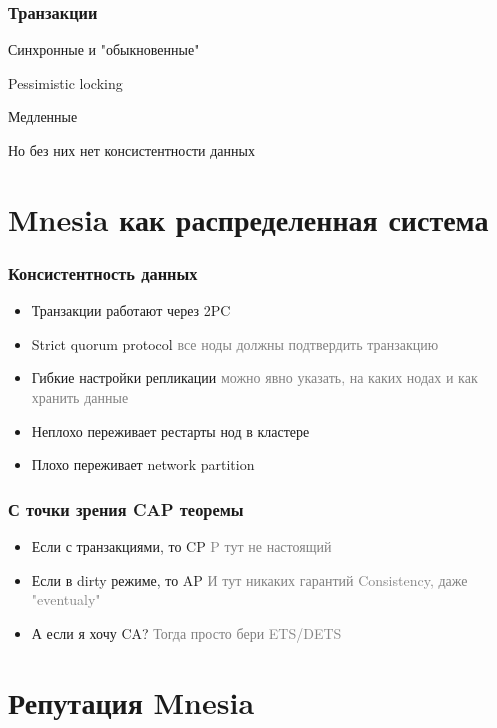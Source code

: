 \documentclass[10pt]{beamer}
\begin{document}
\begin{frame}
\frametitle{Транзакции}
\centering
Синхронные и "обыкновенные"
\par \bigskip
Pessimistic locking
\par \bigskip
Медленные
\par \bigskip
Но без них нет консистентности данных
\end{frame}

\section{Mnesia как распределенная система}

\begin{frame}
\frametitle{Консистентность данных}
\begin{itemize}[<+->]
\item Транзакции работают через 2PC
\item Strict quorum protocol\newline
  \textcolor{gray}{все ноды должны подтвердить транзакцию}
\item Гибкие настройки репликации\newline
  \textcolor{gray}{можно явно указать, на каких нодах и как хранить данные}
\item Неплохо переживает рестарты нод в кластере
\item Плохо переживает network partition
\end{itemize}
\end{frame}

\begin{frame}
\frametitle{С точки зрения CAP теоремы}
\begin{itemize}[<+->]
\item Если с транзакциями, то CP\newline
  \textcolor{gray}{P тут не настоящий}
\item Если в dirty режиме, то AP\newline
  \textcolor{gray}{И тут никаких гарантий Consistency, даже "eventualy"}
\item А если я хочу CA?\newline
  \textcolor{gray}{Тогда просто бери ETS/DETS}
\end{itemize}
\end{frame}

\section{Репутация Mnesia}
\end{document}
